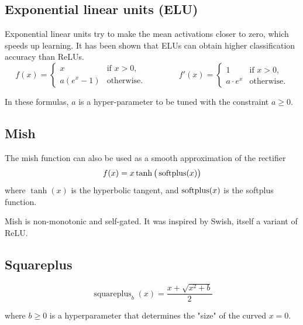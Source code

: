 \subsection{Exponential linear units (ELU) \cite{wiki-Rectifier}}\label{Exponential linear units (ELU)}
Exponential linear units try to make the mean activations closer to zero, which speeds up learning. It has been shown that ELUs can obtain higher classification accuracy than ReLUs.
\[
{\displaystyle f(x)={\begin{cases}x&{\text{if }}x>0,\\a\left(e^{x}-1\right)&{\text{otherwise}}.\end{cases}}\qquad \qquad f'(x)={\begin{cases}1&{\text{if }}x>0,\\a\cdot e^{x}&{\text{otherwise}}.\end{cases}}}
\]

In these formulas, \(\displaystyle a\) is a hyper-parameter to be tuned with the constraint \(\displaystyle a\geq 0\).

\subsection{Mish \cite{wiki-Rectifier}}\label{Mish}
The mish function can also be used as a smooth approximation of the rectifier
\[
\displaystyle f(x)=x\tanh {\big (}\operatorname{softplus} (x){\big )}
\]
where \({\displaystyle \tanh(x)}\) is the hyperbolic tangent, and \({\displaystyle \operatorname{softplus}(x)}\) is the softplus function.\par
Mish is non-monotonic and self-gated. It was inspired by Swish, itself a variant of ReLU.

\subsection{Squareplus \cite{wiki-Rectifier}}\label{Squareplus}
\[
{\displaystyle \operatorname {squareplus} _{b}(x)={\displaystyle\frac {x+{\sqrt {x^{2}+b}}}{2}}}
\]

where \({\displaystyle b\geq 0}\) is a hyperparameter that determines the "size" of the curved \({\displaystyle x=0}\).

